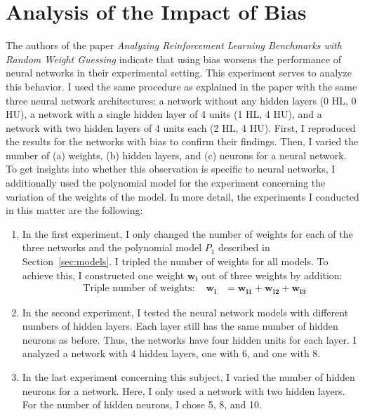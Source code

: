 \section{Analysis of the Impact of Bias}
The authors of the paper \emph{Analyzing Reinforcement Learning Benchmarks with Random Weight Guessing} indicate that using bias worsens the performance of neural networks in their experimental setting. This experiment serves to analyze this behavior. I used the same procedure as explained in the paper with the same three neural network architectures: a network without any hidden layers (0 HL, 0 HU), a network with a single hidden layer of 4 units (1 HL, 4 HU), and a network with two hidden layers of 4 units each (2 HL, 4 HU). First, I reproduced the results for the networks with bias to confirm their findings. Then, I varied the number of (a) weights, (b) hidden layers, and (c) neurons for a neural network. To get insights into whether this observation is specific to neural networks, I additionally used the polynomial model for the experiment concerning the variation of the weights of the model. In more detail, the experiments I conducted in this matter are the following:
\begin{enumerate}[label=(\alph*)]
  \item In the first experiment, I only changed the number of weights for each of the three networks and the polynomial model $P_1$ described in Section~\ref{sec:models}. I tripled the number of weights for all models. To achieve this, I constructed one weight $\mathbf{w_i}$ out of three weights by addition:
  \begin{align*}
    &\text{Triple number of weights: } &\mathbf{w_{i}} &= \mathbf{w_{i1}} + \mathbf{w_{i2}} + \mathbf{w_{i3}}
  \end{align*}
  \item In the second experiment, I tested the neural network models with different numbers of hidden layers. Each layer still has the same number of hidden neurons as before. Thus, the networks have four hidden units for each layer. I analyzed a network with 4 hidden layers, one with 6, and one with 8.
  \item In the last experiment concerning this subject, I varied the number of hidden neurons for a network. Here, I only used a network with two hidden layers. For the number of hidden neurons, I chose 5, 8, and 10.
\end{enumerate}

